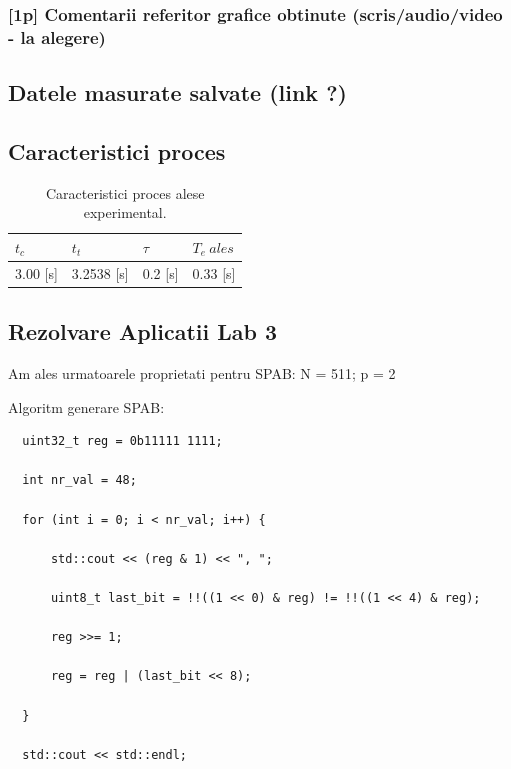 \documentclass[12pt,english]{article}
\begin{document}
\subsubsection { [1p] Comentarii referitor grafice obtinute (scris/audio/video - la alegere) }
\subsection { Datele masurate salvate (link ?) }
\subsection { Caracteristici proces }
\begin{table}[h!]
  \centering
    \begin{tabular}{|l|l|l|l|}
      \hline
      $t_c$ & $t_t$ & $\tau$ & $T_e\ ales$ \\
      \hline
      3.00 [s] & 3.2538 [s] & 0.2 [s] & 0.33 [s] \\
      \hline
    \end{tabular}
    \caption{Caracteristici proces alese experimental.}
\end{table}

\subsection { Rezolvare Aplicatii Lab 3 }
Am ales urmatoarele proprietati pentru SPAB:
N = 511; p = 2

\begin{center}
\end{center}

Algoritm generare SPAB:
\begin{lstlisting}
  uint32_t reg = 0b11111 1111; 

  int nr_val = 48; 

  for (int i = 0; i < nr_val; i++) { 

      std::cout << (reg & 1) << ", "; 

      uint8_t last_bit = !!((1 << 0) & reg) != !!((1 << 4) & reg); 

      reg >>= 1; 

      reg = reg | (last_bit << 8); 

  } 

  std::cout << std::endl;
\end{lstlisting}
\end{document}
